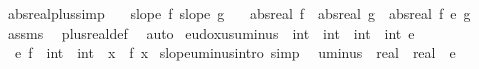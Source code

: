 \begin{isabellebody}
\isanewline
{}\isamarkupfalse%
\ abs{\isacharunderscore}{\kern0pt}real{\isacharunderscore}{\kern0pt}plus{\isacharbrackleft}{\kern0pt}simp{\isacharbrackright}{\kern0pt}{\isacharcolon}{\kern0pt}\isanewline
\ \ \ {\isachardoublequoteopen}slope\ f{\isachardoublequoteclose}\ {\isachardoublequoteopen}slope\ g{\isachardoublequoteclose}\isanewline
\ \ \ {\isachardoublequoteopen}abs{\isacharunderscore}{\kern0pt}real\ f\ {\isacharplus}{\kern0pt}\ abs{\isacharunderscore}{\kern0pt}real\ g\ {\isacharequal}{\kern0pt}\ abs{\isacharunderscore}{\kern0pt}real\ {\isacharparenleft}{\kern0pt}f\ {\isacharplus}{\kern0pt}\isactrlsub e\ g{\isacharparenright}{\kern0pt}{\isachardoublequoteclose}\isanewline
%
\isadelimproof
\ \ %
\endisadelimproof
%
\isatagproof
{}\isamarkupfalse%
\ assms\ \isamarkupfalse%
\ plus{\isacharunderscore}{\kern0pt}real{\isacharunderscore}{\kern0pt}def\ \isamarkupfalse%
\ auto%
\endisatagproof
{\isafoldproof}%
%
\isadelimproof
\isanewline
%
\endisadelimproof
\isanewline
{}\isamarkupfalse%
\ eudoxus{\isacharunderscore}{\kern0pt}uminus\ {\isacharcolon}{\kern0pt}{\isacharcolon}{\kern0pt}\ {\isachardoublequoteopen}{\isacharparenleft}{\kern0pt}int\ {\isasymRightarrow}\ int{\isacharparenright}{\kern0pt}\ {\isasymRightarrow}\ {\isacharparenleft}{\kern0pt}int\ {\isasymRightarrow}\ int{\isacharparenright}{\kern0pt}{\isachardoublequoteclose}\ {\isacharparenleft}{\kern0pt}{\isachardoublequoteopen}{\isacharminus}{\kern0pt}\isactrlsub e{\isachardoublequoteclose}{\isacharparenright}{\kern0pt}\ \isanewline
\ \ {\isachardoublequoteopen}{\isacharminus}{\kern0pt}\isactrlsub e\ {\isacharparenleft}{\kern0pt}f\ {\isacharcolon}{\kern0pt}{\isacharcolon}{\kern0pt}\ int\ {\isasymRightarrow}\ int{\isacharparenright}{\kern0pt}\ {\isacharequal}{\kern0pt}\ {\isacharparenleft}{\kern0pt}{\isasymlambda}x{\isachardot}{\kern0pt}\ {\isacharminus}{\kern0pt}\ f\ x{\isacharparenright}{\kern0pt}{\isachardoublequoteclose}\isanewline
\isanewline
{}\isamarkupfalse%
\ slope{\isacharunderscore}{\kern0pt}uminus{\isacharprime}{\kern0pt}{\isacharbrackleft}{\kern0pt}intro{\isacharcomma}{\kern0pt}\ simp{\isacharbrackright}{\kern0pt}\isanewline
\isanewline
{}\isamarkupfalse%
\isanewline
\ \ {\isachardoublequoteopen}{\isacharparenleft}{\kern0pt}uminus{\isacharparenright}{\kern0pt}\ {\isacharcolon}{\kern0pt}{\isacharcolon}{\kern0pt}\ {\isacharparenleft}{\kern0pt}real\ {\isasymRightarrow}\ real{\isacharparenright}{\kern0pt}{\isachardoublequoteclose}\ \ {\isachardoublequoteopen}{\isacharminus}{\kern0pt}\isactrlsub e{\isachardoublequoteclose}\isanewline

\end{isabellebody}
